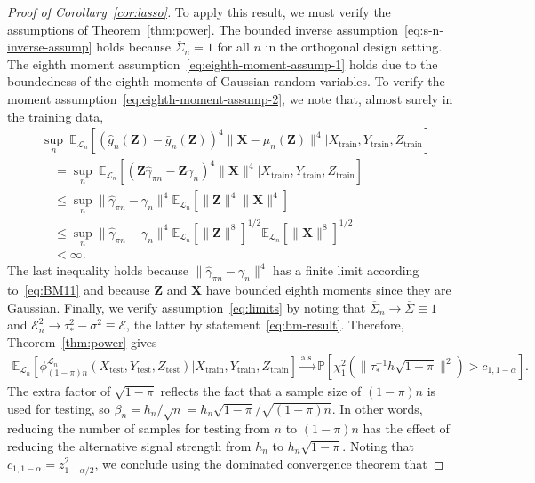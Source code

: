 \documentclass[ejs]{imsart}
\numberwithin{equation}{section}
\theoremstyle{plain}
\theoremstyle{definition}
\theoremstyle{remark}
\newcommand{\prx}{\bm X}
\newcommand{\srx}{X}
\newcommand{\prz}{\bm Z}
\newcommand{\srz}{Z}
\newcommand{\sry}{Y}
\begin{document}
\begin{proof}[Proof of Corollary~\ref{cor:lasso}]
To apply this result, we must verify the assumptions of Theorem~\ref{thm:power}. The bounded inverse assumption~\eqref{eq:s-n-inverse-assump} holds because $\overline \Sigma_n = 1$ for all $n$ in the orthogonal design setting. The eighth moment assumption~\eqref{eq:eighth-moment-assump-1} holds due to the boundedness of the eighth moments of Gaussian random variables. To verify the moment assumption~\eqref{eq:eighth-moment-assump-2}, we note that, almost surely in the training data,
\begin{equation*}
\begin{split}
&\sup_n\ \mathbb E_{\mathcal L_n}[(\widehat g_n(\prz)-\bar g_n(\prz))^4\|\prx - \mu_n(\prz)\|^4|\srx_{\text{train}}, \sry_{\text{train}}, \srz_{\text{train}}] \\
&\quad= \sup_n\ \mathbb E_{\mathcal L_n}[(\prz \widehat \gamma_{\pi n} - \prz \gamma_n)^4\|\prx\|^4|\srx_{\text{train}}, \sry_{\text{train}}, \srz_{\text{train}}] \\
&\quad\leq \sup_n\|\widehat \gamma_{\pi n} - \gamma_n\|^4  \mathbb E_{\mathcal L_n}[\|\prz\|^4\|\prx\|^4] \\
&\quad\leq \sup_n\|\widehat \gamma_{\pi n} - \gamma_n\|^4  \mathbb E_{\mathcal L_n}[\|\prz\|^8]^{1/2} \mathbb E_{\mathcal L_n}[\|\prx\|^8]^{1/2} \\
&\quad < \infty.
\end{split}
\end{equation*}
The last inequality holds because $\|\widehat \gamma_{\pi n} - \gamma_n\|^4$ has a finite limit according to~\eqref{eq:BM11} and because $\prz$ and $\prx$ have bounded eighth moments since they are Gaussian. Finally, we verify assumption~\eqref{eq:limits} by noting that $\overline \Sigma_n\rightarrow \overline \Sigma \equiv 1$ and $\mathcal E_n^2 \rightarrow \tau_*^2 - \sigma^2 \equiv \mathcal E$, the latter by statement~\eqref{eq:bm-result}. Therefore, Theorem~\ref{thm:power} gives 
\begin{equation*}
	\begin{split}
		\mathbb E_{\mathcal L_n}[\phi^{\mathcal L_n}_{(1-\pi)n}(\srx_{\text{test}}, \sry_{\text{test}}, \srz_{\text{test}})|\srx_{\text{train}}, \sry_{\text{train}}, \srz_{\text{train}}] \overset{\text{a.s.}}\rightarrow \mathbb P[\chi^2_1(\|\tau_*^{-1} h\sqrt{1-\pi}\|^2) > c_{1,1-\alpha}].
	\end{split}
\end{equation*}
The extra factor of $\sqrt{1-\pi}$ reflects the fact that a sample size of $(1-\pi)n$ is used for testing, so $\beta_n = h_n/\sqrt{n} = h_n\sqrt{1-\pi}/\sqrt{(1-\pi)n}$. In other words, reducing the number of samples for testing from $n$ to $(1-\pi)n$ has the effect of reducing the alternative signal strength from $h_n$ to $h_n \sqrt{1-\pi}$. Noting that $c_{1,1-\alpha} = z^2_{1-\alpha/2}$, we conclude using the dominated convergence theorem that

\end{proof}
\end{document}
